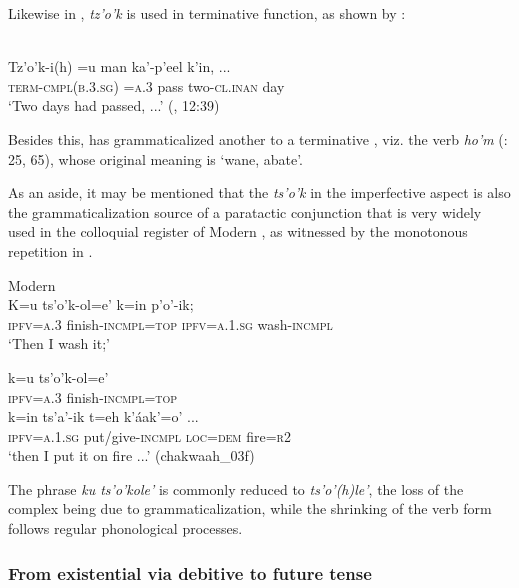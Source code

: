 \documentclass[output=paper]{langsci/langscibook}
\begin{document}
Likewise in , \textit{tz'o'k} is used in terminative function, as shown by :

\ea\label{ex:lehmann:55}
 \\
\gll      Tz’o’k-i(h)        =u    man    ka’-p’eel      k’in, ...\\
 \textsc{term-cmpl(b.3.sg)}   \textsc{=a.3}   pass    two-\textsc{cl.inan}    day\\
\glt ‘Two days had passed, ...’ (\citealt{Hofling2006}, 12:39)
\z

Besides this,  has grammaticalized another  to a terminative , viz. the verb \textit{ho'm} (\citealt{Hofling1991}: 25, 65), whose original meaning is ‘wane, abate’.

As an aside, it may be mentioned that the  \textit{ts’o’k} in the imperfective aspect is also the grammaticalization source of a paratactic conjunction that is very widely used in the colloquial register of Modern  , as witnessed by the monotonous repetition in .\largerpage[2]

\ea\label{ex:lehmann:56}
Modern  \\
\gll       K=u       ts'o'k-ol=e'                   k=in               p'o'-ik;\\
  \textsc{ipfv=a.3}  finish-\textsc{incmpl=top } \textsc{ipfv=a.1.sg}  wash-\textsc{incmpl}\\
\glt ‘Then I wash it;’\newpage

\gll   k=u          ts'o'k-ol=e'          \\
\textsc{ipfv=a.3}  finish-\textsc{incmpl=top}\\

\gll k=in                       ts'a'-ik              t=eh        k'áak'=o’ ...\\
      \textsc{ipfv=a.1.sg}  put/give-\textsc{incmpl} \textsc{loc=dem}    fire=\textsc{r2}\\

\glt ‘then I put it on fire ...’ (chakwaah\_03f)
\z

The phrase \textit{ku ts’o’}\textit{k}\textit{ole’} is commonly reduced to \textit{ts’o’(h)le’}, the loss of the  complex being due to grammaticalization, while the shrinking of the verb form follows regular phonological processes.

\subsubsection{From existential via debitive to future tense}\label{sec:lehmann:4.7.5}
\end{document}
